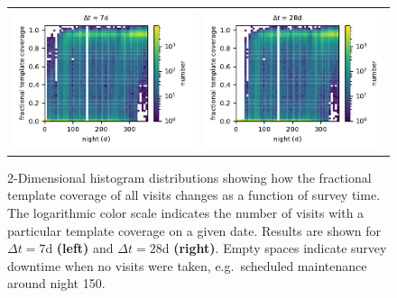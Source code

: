 \documentclass[preprintm,linenumbers]{aastex631}
\begin{document}
  \begin{figure}
      \centering
      			\begin{tabular}{@{}c@{}c@{}}
      \includegraphics{results/fractional_template_coverage_first_year_one_snap_v4_0_10yrs_db_noDD_noTwi_7_2d_hist.pdf} &
            \includegraphics{results/fractional_template_coverage_first_year_one_snap_v4_0_10yrs_db_noDD_noTwi_28_2d_hist.pdf} \\
\end{tabular}
\caption{2-Dimensional histogram distributions showing how the fractional template coverage of all visits changes as a function of survey time.
The logarithmic color scale indicates the number of visits with a particular template coverage on a given date. Results are shown for $\Delta t = 7$d \textbf{(left)} and $\Delta t = 28$d \textbf{(right)}.
Empty spaces indicate survey downtime when no visits were taken, e.g.\ scheduled maintenance around night 150.
}
\label{fig:fractional_template_coverage-2d}
  \end{figure}
  
\end{document}
